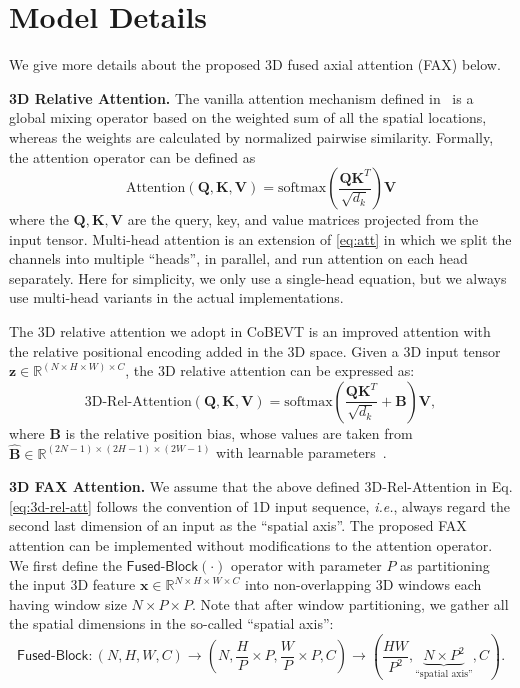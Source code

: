 \documentclass{article}
\begin{document}
{\section{Model Details}
\label{sec:model}

We give more details about the proposed 3D fused axial attention (FAX) below.

\textbf{3D Relative Attention.}
The vanilla attention mechanism defined in~\cite{vaswani2017attention} is a global mixing operator based on the weighted sum of all the spatial locations, whereas the weights are calculated by normalized pairwise similarity.
Formally, the attention operator can be defined as
\begin{equation}
\label{eq:att}
\text{Attention}(\mathbf{Q},\mathbf{K},\mathbf{V})=\text{softmax}(\frac{\mathbf{Q}\mathbf{K}^{T}}{\sqrt{d_k}})\mathbf{V}
\end{equation}
where the $\mathbf{Q},\mathbf{K},\mathbf{V}$ are the query, key, and value matrices projected from the input tensor. Multi-head attention is an extension of \eqref{eq:att} in which we split the channels into multiple ``heads'', in parallel, and run attention on each head separately. Here for simplicity, we only use a single-head equation, but we always use multi-head variants in the actual implementations.


The 3D relative attention we adopt in CoBEVT is an improved attention with the relative positional encoding added in the 3D space. Given a 3D input tensor $\mathbf{z}\in \mathbb{R}^{(N\times H\times W)\times C}$, the 3D relative attention can be expressed as:
\begin{equation}
\label{eq:3d-rel-att}
\text{3D-Rel-Attention}(\mathbf{Q},\mathbf{K},\mathbf{V})=\text{softmax}(\frac{\mathbf{Q}\mathbf{K}^{T}}{\sqrt{d_k}}+\mathbf{B})\mathbf{V},
\end{equation}
where $\mathbf{B}$ is the relative position bias, whose values are taken from $\hat{\mathbf{B}}\in \mathbb{R}^{(2N-1)\times(2H-1)\times (2W-1)}$ with learnable parameters~\cite{liu2021swin,liu2021video}.



\textbf{3D FAX Attention.}
We assume that the above defined 3D-Rel-Attention in Eq. \eqref{eq:3d-rel-att} follows the convention of 1D input sequence, \textit{i.e.}, always regard the second last dimension of an input as the ``spatial axis''. The proposed FAX attention can be implemented without modifications to the attention operator.
We first define the $\mathsf{Fused\text{-}Block}(\cdot)$ operator with parameter $P$ as partitioning the input 3D feature $\mathbf{x}\in\mathbb{R}^{N\times H\times W\times C}$ into non-overlapping 3D windows each having window size $N\times P\times P$. Note that after window partitioning, we gather all the spatial dimensions in the so-called ``spatial axis'':
\begin{equation}
\label{eq:block-operator}
\mathsf{Fused\text{-}Block}: (N,H,W,C)\rightarrow(N,\frac{H}{P}\times P,\frac{W}{P}\times P,C)\rightarrow (\frac{HW}{P^2},\underbrace{{N\times P^2}}_{\text{``spatial axis''}},C).
\end{equation}



}
\end{document}
